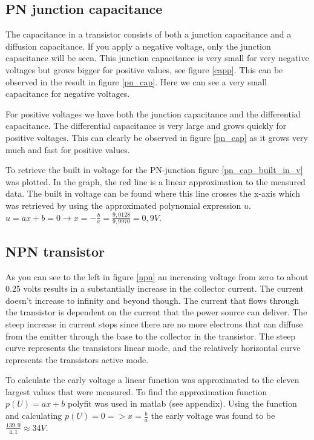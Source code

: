 \documentclass[a4paper]{article}
\begin{document}
\subsection{PN junction capacitance}
The capacitance in a transistor consists of both a junction capacitance and a diffusion capacitance. If you apply a negative voltage, only the junction capacitance will be seen. This junction capacitance is very small for very negative voltages but grows bigger for positive values, see figure \ref{capp}. This can be observed in the result in figure \ref{pn_cap}. Here we can see a very small capacitance for negative voltages.

For positive voltages we have both the junction capacitance and the differential capacitance. The differential capacitance is very large and grows quickly for positive voltages. This can clearly be observed in figure \ref{pn_cap} as it grows very much and fast for positive values.

To retrieve the built in voltage for the PN-junction figure \ref{pn_cap_built_in_v} was plotted. In the graph, the red line is a linear approximation to the measured data. The built in voltage can be found where this line crosses the x-axis which was retrieved by using the approximated polynomial expression $u$. $ u = ax + b = 0 \rightarrow x = -\frac{b}{a} = \frac{9,0128}{9,9970} = 0,9V$.

\subsection{NPN transistor}
As you can see to the left in figure \ref{npn} an increasing voltage from zero to about 0.25 volts results in a substantially increase in the collector current. The current doesn't increase to infinity and beyond though. The current that flows through the transistor is dependent on the current that the power source can deliver. The steep increase in current stops since there are no more electrons that can diffuse from the emitter through the base to the collector in the transistor. The steep curve represents the transistors linear mode, and the relatively horizontal curve represents the transistors active mode.

To calculate the early voltage a linear function was approximated to the eleven largest values that were measured. To find the approximation function $p(U) = ax + b$ polyfit was used in matlab (see appendix). Using the function and calculating $p(U) = 0 => x = \frac{b}{a}$ the early voltage was found to be $\frac{139,9}{4,1} \approx 34V$.
\end{document}
